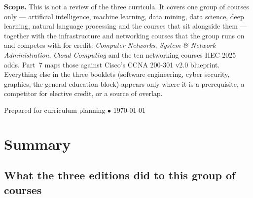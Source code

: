 \documentclass[11pt,a4paper,oneside]{report}
\begin{document}
\begin{center}
\vspace{1.1cm}

\begin{tcolorbox}[enhanced, width=0.88\textwidth, colback=lightbg,
  colframe=primary, boxrule=0pt, leftrule=4pt, arc=2pt, top=6pt, bottom=6pt]
\small
\textbf{\color{primary}Scope.} This is not a review of the three curricula. It
covers one group of courses only --- artificial intelligence, machine learning,
data mining, data science, deep learning, natural language processing and the
courses that sit alongside them --- together with the infrastructure and
networking courses that the group runs on and competes with for credit:
\emph{Computer Networks}, \emph{System \& Network Administration}, \emph{Cloud
Computing} and the ten networking courses HEC 2025 adds. Part~7 maps those
against Cisco's CCNA 200-301 v2.0 blueprint. Everything else in the three booklets
(software engineering, cyber security, graphics, the general education block)
appears only where it is a prerequisite, a competitor for elective credit, or a
source of overlap.
\end{tcolorbox}

\vspace{0.9cm}
{\small\color{gray!60!black}Prepared for curriculum planning
$\bullet$ \today}
\end{center}

\newpage
{}
\tableofcontents
\newpage
{}
\setcounter{page}{1}

\section*{Summary}

\subsection*{What the three editions did to this group of courses}
\end{document}
